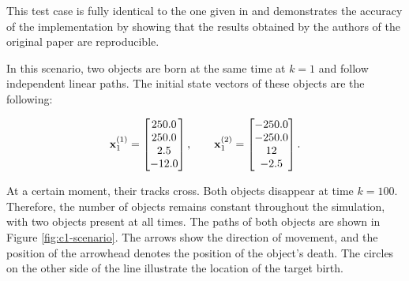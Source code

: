 This test case is fully identical to the one given in \cite{voGaussianMixtureProbability2006} and demonstrates the accuracy of the implementation by showing that the results obtained by the authors of the original paper are reproducible.

In this scenario, two objects are born at the same time at $k=1$ and follow independent linear paths. The initial state vectors of these objects are the following:

\begin{equation}
    \svecat{x}{1}{(1)} = \begin{bmatrix}
        250.0 \\
        250.0 \\
        2.5 \\
        -12.0
    \end{bmatrix},
    \qquad
    \svecat{x}{1}{(2)} = \begin{bmatrix}
        -250.0 \\
        -250.0 \\
        12 \\
        -2.5
    \end{bmatrix}.
\end{equation}

At a certain moment, their tracks cross. Both objects disappear at time $k=100$. Therefore, the number of objects remains constant throughout the simulation, with two objects present at all times. The paths of both objects are shown in Figure \ref{fig:c1-scenario}. The arrows show the direction of movement, and the position of the arrowhead denotes the position of the object's death. The circles on the other side of the line illustrate the location of the target birth.

